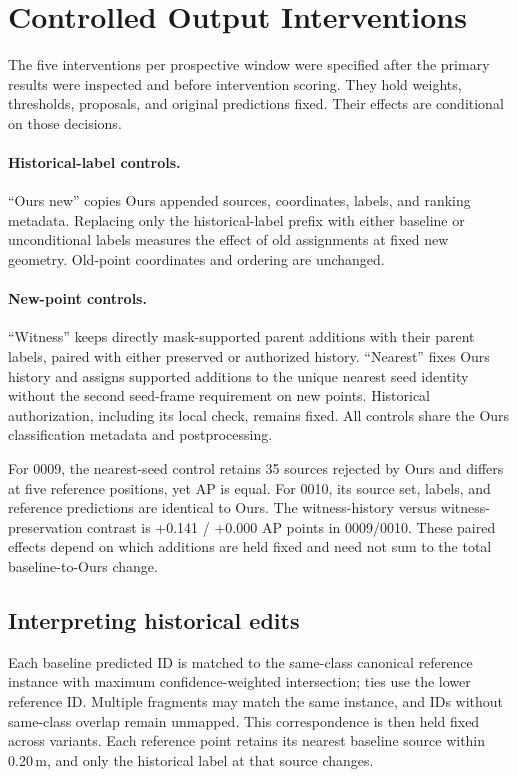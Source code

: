 \section{Controlled Output Interventions}\label{app:causal}
The five interventions per prospective window were specified after the primary results were inspected and before intervention scoring. They hold weights, thresholds, proposals, and original predictions fixed. Their effects are conditional on those decisions.

\paragraph{Historical-label controls.}
``Ours new'' copies Ours appended sources, coordinates, labels, and ranking metadata. Replacing only the historical-label prefix with either baseline or unconditional labels measures the effect of old assignments at fixed new geometry. Old-point coordinates and ordering are unchanged.

\paragraph{New-point controls.}
``Witness'' keeps directly mask-supported parent additions with their parent labels, paired with either preserved or authorized history. ``Nearest'' fixes Ours history and assigns supported additions to the unique nearest seed identity without the second seed-frame requirement on new points. Historical authorization, including its local check, remains fixed. All controls share the Ours classification metadata and postprocessing.

\begin{center}\small

\end{center}

For 0009, the nearest-seed control retains 35 sources rejected by Ours and differs at five reference positions, yet AP is equal. For 0010, its source set, labels, and reference predictions are identical to Ours. The witness-history versus witness-preservation contrast is +0.141 / +0.000 AP points in 0009/0010. These paired effects depend on which additions are held fixed and need not sum to the total baseline-to-Ours change.

\subsection{Interpreting historical edits}
Each baseline predicted ID is matched to the same-class canonical reference instance with maximum confidence-weighted intersection; ties use the lower reference ID. Multiple fragments may match the same instance, and IDs without same-class overlap remain unmapped. This correspondence is then held fixed across variants. Each reference point retains its nearest baseline source within 0.20\,m, and only the historical label at that source changes.

